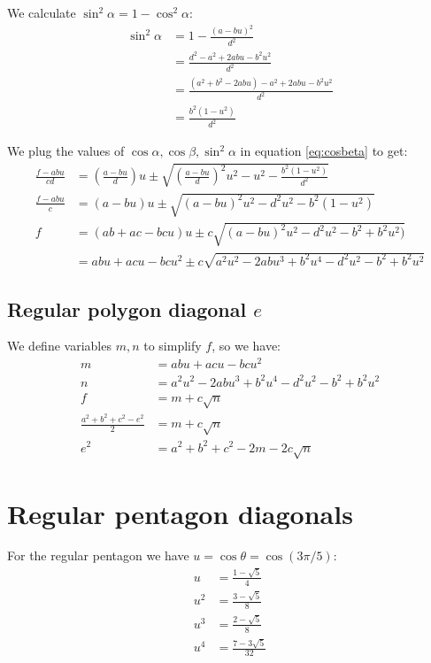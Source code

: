 \documentclass[11pt]{article}
\begin{document}
We calculate $\sin^2\alpha = 1 - \cos^2\alpha$:
\begin{align}
\sin^2\alpha &= 1 - \frac{(a - bu)^2}{d^2}\nonumber\\
 &=\frac{d^2 - a^2 + 2abu - b^2u^2}{d^2}\nonumber\\
 &=\frac{(a^2 + b^2 - 2abu) - a^2 + 2abu - b^2u^2}{d^2}\nonumber\\
 &=\frac{b^2(1-u^2)}{d^2}
\end{align}

We plug the values of $\cos\alpha, \cos\beta, \sin^2\alpha$ in equation \ref{eq:cosbeta} to get:
\begin{align}
\frac{f - abu}{cd} &= \left(\frac{a - bu}{d}\right)u \pm \sqrt{
 \left(\frac{a - bu}{d}\right)^2u^2 - u^2 - \frac{b^2(1-u^2)}{d^2}
}\nonumber\\
\frac{f - abu}{c} &= (a - bu)u \pm \sqrt{(a-bu)^2u^2 - d^2u^2 - b^2(1-u^2)}\nonumber\\
f &= (ab + ac - bcu)u \pm c\sqrt{(a-bu)^2u^2 - d^2u^2 - b^2 +b^2u^2)}\nonumber\\
 &= abu + acu - bcu^2 \pm c\sqrt{a^2u^2 - 2abu^3 + b^2u^4- d^2u^2 - b^2 +b^2u^2 }
\end{align}

\subsection{Regular polygon diagonal $e$}

We define variables $m,n$ to simplify $f$, so we have:
\begin{align}
m &= abu + acu - bcu^2 \label{eq:m}\\
n &= a^2u^2 - 2abu^3 + b^2u^4- d^2u^2 - b^2 +b^2u^2 \label{eq:n}\\
f &= m + c\sqrt{n} \label{eq:f}\\
\frac{a^2 + b^2 + c^2 - e^2}{2} &= m + c\sqrt{n}\\
e^2 &= a^2 + b^2 + c^2 - 2m - 2c\sqrt{n} \label{eq:e}
\end{align}

\section{Regular pentagon diagonals}

For the regular pentagon we have $u = \cos\theta = \cos(3\pi/5)$:
\begin{align}
u &= \frac{1-\sqrt{5}}{4}\\
u^2 &= \frac{3-\sqrt{5}}{8}\\
u^3 &= \frac{2-\sqrt{5}}{8}\\
u^4 &= \frac{7-3\sqrt{5}}{32}
\end{align}
\end{document}
